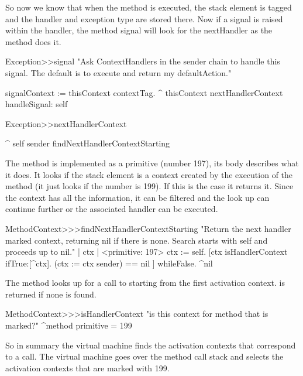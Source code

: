 \documentclass[a4paper,10pt,twoside]{book}
\begin{document}
So now we know that when the method  is executed, the stack element is tagged and the handler and exception type 
are stored there. Now if a signal is raised within the handler, the method signal will look for the nextHandler as the method 
does it.

\begin{code}{}
Exception>>signal
	"Ask ContextHandlers in the sender chain to handle this signal.  The default is to execute and return my defaultAction."

	signalContext := thisContext contextTag.
	^ thisContext nextHandlerContext handleSignal: self
\end{code}

\begin{code}{}
Exception>>nextHandlerContext

	^ self sender findNextHandlerContextStarting
\end{code}

The method  is implemented as a primitive (number 197), its body describes what it does. It looks 
if the stack element is a context created by the execution of the method  (it just looks if the number is 199). If this is  the case it returns it. Since the context has all the information, it can be filtered and the look up can continue further or the associated handler can be executed. 

\begin{code}{}
MethodContext>>>findNextHandlerContextStarting 
	"Return the next handler marked context, returning nil if there 
	is none. Search starts with self and proceeds up to nil." 
	| ctx |	
	<primitive: 197> 
	ctx := self. 
	[ctx isHandlerContext ifTrue:[^ctx]. 
	(ctx := ctx sender) == nil ] whileFalse. 
	^nil 
\end{code}

The method  looks up for a call to  starting from the first activation context.  is returned if none is found. 

\begin{code}{}
MethodContext>>>isHandlerContext 
	"is this context for method that is marked?" 
	^method primitive = 199 
\end{code}

So in summary the virtual machine finds the activation contexts that correspond to a  call. The virtual machine goes over the method call stack and selects the activation contexts that are marked with 199.
\end{document}

